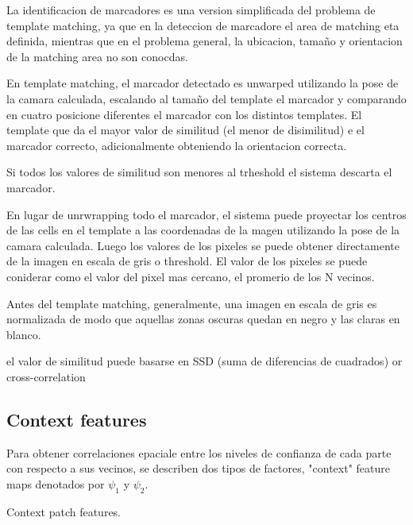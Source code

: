 \documentclass[runningheads]{llncs}
\begin{document}
La identificacion de marcadores es una version simplificada del problema de template matching, ya que en la deteccion de marcadore el area de matching eta definida, mientras que en el problema general, la ubicacion, tamaño y orientacion de la matching area no son conocdas.

En template matching, el marcador detectado es unwarped utilizando la pose de la camara calculada, escalando al tamaño del template el marcador y comparando en cuatro posicione diferentes el marcador con los distintos templates. El template que da el mayor valor de similitud (el menor de disimilitud) e el marcador correcto, adicionalmente obteniendo la orientacion correcta.

Si todos los valores de similitud son menores al trheshold el sistema descarta el marcador.

En lugar de unrwrapping todo el marcador, el sistema puede proyectar los centros de las cells en el template a las coordenadas de la magen utilizando la pose de la camara calculada. Luego los valores de los pixeles se puede obtener directamente de la imagen en escala de gris o threshold. El valor de los pixeles se puede coniderar como el valor del pixel mas cercano, el promerio de los N vecinos.


Antes del template matching, generalmente, una imagen en escala de gris es normalizada de modo que aquellas zonas oscuras quedan en negro y las claras en blanco.

el valor de similitud puede basarse en SSD (suma de diferencias de cuadrados) or cross-correlation

\subsection{Context features}
Para obtener correlaciones epaciale entre los niveles de confianza de cada parte con respecto a sus vecinos, se describen dos tipos de factores, "context" feature maps denotados por $\psi_1$ y $\psi_2$.

Context patch features. 
\end{document}

